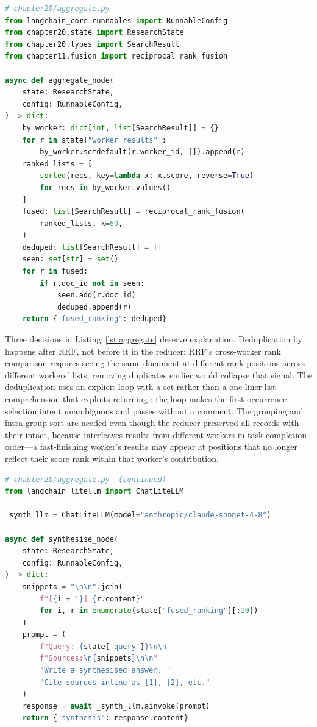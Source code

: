 \begin{lstlisting}[language=Python,
  caption={Aggregation node: per-worker grouping, RRF, post-fusion
           deduplication},
  label={lst:aggregate}]
# chapter20/aggregate.py
from langchain_core.runnables import RunnableConfig
from chapter20.state import ResearchState
from chapter20.types import SearchResult
from chapter11.fusion import reciprocal_rank_fusion

async def aggregate_node(
    state: ResearchState,
    config: RunnableConfig,
) -> dict:
    by_worker: dict[int, list[SearchResult]] = {}
    for r in state["worker_results"]:
        by_worker.setdefault(r.worker_id, []).append(r)
    ranked_lists = [
        sorted(recs, key=lambda x: x.score, reverse=True)
        for recs in by_worker.values()
    ]
    fused: list[SearchResult] = reciprocal_rank_fusion(
        ranked_lists, k=60,
    )
    deduped: list[SearchResult] = []
    seen: set[str] = set()
    for r in fused:
        if r.doc_id not in seen:
            seen.add(r.doc_id)
            deduped.append(r)
    return {"fused_ranking": deduped}
\end{lstlisting}

Three decisions in Listing~\ref{lst:aggregate} deserve explanation.
Deduplication by  happens after RRF, not before it in the
reducer: RRF's cross-worker rank comparison requires seeing the same
document at different rank positions across different workers' lists;
removing duplicates earlier would collapse that signal.
The deduplication uses an explicit  loop with a  set
rather than a one-liner list comprehension that exploits
 returning : the loop makes the first-occurrence
selection intent unambiguous and passes  without a
 comment. The  grouping and
intra-group sort are needed even though the reducer preserved all records
with their  intact, because 
interleaves results from different workers in task-completion order---a
fast-finishing worker's results may appear at positions that no longer
reflect their score rank within that worker's contribution.

\begin{lstlisting}[language=Python,
  caption={Synthesis node: top-ten fused results as numbered snippets},
  label={lst:synthesise}]
# chapter20/aggregate.py  (continued)
from langchain_litellm import ChatLiteLLM

_synth_llm = ChatLiteLLM(model="anthropic/claude-sonnet-4-8")

async def synthesise_node(
    state: ResearchState,
    config: RunnableConfig,
) -> dict:
    snippets = "\n\n".join(
        f"[{i + 1}] {r.content}"
        for i, r in enumerate(state["fused_ranking"][:10])
    )
    prompt = (
        f"Query: {state['query']}\n\n"
        f"Sources:\n{snippets}\n\n"
        "Write a synthesised answer. "
        "Cite sources inline as [1], [2], etc."
    )
    response = await _synth_llm.ainvoke(prompt)
    return {"synthesis": response.content}
\end{lstlisting}

